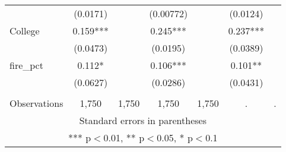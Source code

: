 \begin{tabular}{lcccccc}
 & (0.0171) &  & (0.00772) &  & (0.0124) &  \\
College & 0.159*** &  & 0.245*** &  & 0.237*** &  \\
 & (0.0473) &  & (0.0195) &  & (0.0389) &  \\
fire\_pct & 0.112* &  & 0.106*** &  & 0.101** &  \\
 & (0.0627) &  & (0.0286) &  & (0.0431) &  \\
 &  &  &  &  &  &  \\
 Observations & 1,750 & 1,750 & 1,750 & 1,750 & . & . \\ \hline
\multicolumn{7}{c}{ Standard errors in parentheses} \\
\multicolumn{7}{c}{ *** p$<$0.01, ** p$<$0.05, * p$<$0.1} \\
\end{tabular}
